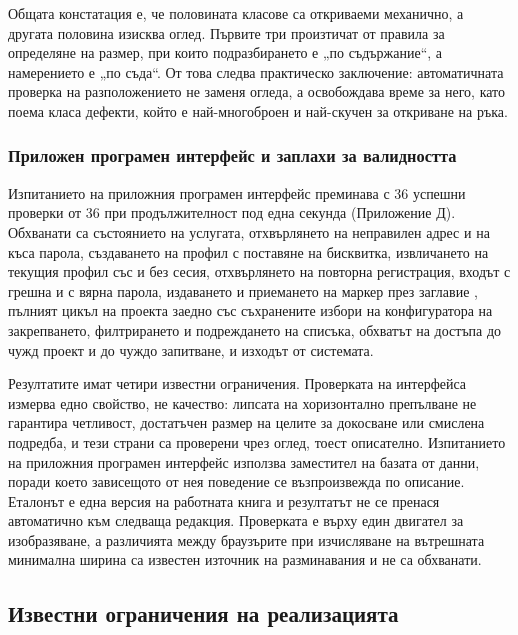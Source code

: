Общата констатация е, че половината класове са откриваеми механично, а другата половина
изисква оглед. Първите три произтичат от правила за определяне на размер, при които
подразбирането е „по съдържание“, а намерението е „по съда“. От това следва практическо
заключение: автоматичната проверка на разположението не заменя огледа, а освобождава
време за него, като поема класа дефекти, който е най-многоброен и най-скучен за
откриване на ръка.

\subsubsection{Приложен програмен интерфейс и заплахи за валидността}
\label{subsec:apires}

Изпитанието на приложния програмен интерфейс преминава с 36 успешни проверки от 36 при
продължителност под една секунда (Приложение Д). Обхванати са състоянието на услугата,
отхвърлянето на неправилен адрес и на къса парола, създаването на профил с поставяне на
бисквитка, извличането на текущия профил със и без сесия, отхвърлянето на повторна
регистрация, входът с грешна и с вярна парола, издаването и приемането на маркер през
заглавие , пълният цикъл на проекта заедно със съхранените избори
на конфигуратора на закрепването, филтрирането и подреждането на списъка, обхватът на
достъпа до чужд проект и до чуждо запитване, и изходът от системата.

Резултатите имат четири известни ограничения. Проверката на интерфейса измерва едно
свойство, не качество: липсата на хоризонтално препълване не гарантира четливост,
достатъчен размер на целите за докосване или смислена подредба, и тези страни са
проверени чрез оглед, тоест описателно. Изпитанието на приложния програмен интерфейс
използва заместител на базата от данни, поради което зависещото от нея поведение се
възпроизвежда по описание. Еталонът е една версия на работната книга и резултатът не се
пренася автоматично към следваща редакция. Проверката е върху един двигател за
изобразяване, а различията между браузърите при изчисляване на вътрешната минимална
ширина са известен източник на разминавания и не са обхванати.

\subsection{Известни ограничения на реализацията}
\label{subsec:limitations}

